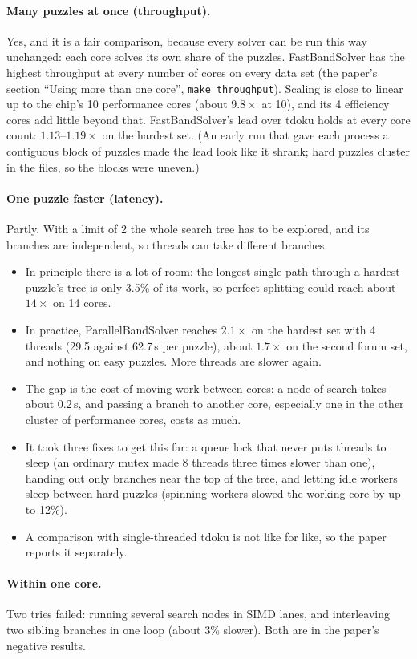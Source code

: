 \documentclass[11pt]{article}
\begin{document}
\paragraph{Many puzzles at once (throughput).} Yes, and it is a fair comparison, because every solver can be run
this way unchanged: each core solves its own share of the puzzles. FastBandSolver has the highest throughput at every
number of cores on every data set (the paper's section ``Using more than one core'', \texttt{make throughput}). Scaling is close to linear up to the chip's 10 performance cores (about $9.8\times$ at 10), and its 4 efficiency
cores add little beyond that. FastBandSolver's lead over tdoku holds at every core count: $1.13$--$1.19\times$ on the
hardest set. (An early run that gave each process a contiguous block of puzzles made the lead look like it shrank;
hard puzzles cluster in the files, so the blocks were uneven.)

\paragraph{One puzzle faster (latency).} Partly. With a limit of 2 the whole search tree has to be explored, and its
branches are independent, so threads can take different branches.
\begin{itemize}
\item In principle there is a lot of room: the longest single path through a hardest puzzle's tree is only 3.5\% of
  its work, so perfect splitting could reach about $14\times$ on 14 cores.
\item In practice, ParallelBandSolver reaches $2.1\times$ on the hardest set with 4 threads (29.5 against 62.7\,\textmu s
  per puzzle), about $1.7\times$ on the second forum set, and nothing on easy puzzles. More threads are slower again.
\item The gap is the cost of moving work between cores: a node of search takes about 0.2\,\textmu s, and passing a branch
  to another core, especially one in the other cluster of performance cores, costs as much.
\item It took three fixes to get this far: a queue lock that never puts threads to sleep (an ordinary mutex made 8
  threads three times slower than one), handing out only branches near the top of the tree, and letting idle workers
  sleep between hard puzzles (spinning workers slowed the working core by up to 12\%).
\item A comparison with single-threaded tdoku is not like for like, so the paper reports it separately.
\end{itemize}

\paragraph{Within one core.} Two tries failed: running several search nodes in SIMD lanes, and interleaving two sibling
branches in one loop (about 3\% slower). Both are in the paper's negative results.
\end{document}
